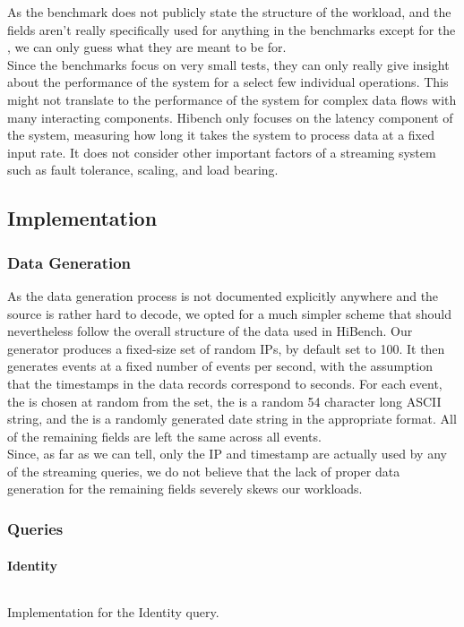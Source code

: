 As the benchmark does not publicly state the structure of the workload, and the fields aren't really specifically used for anything in the benchmarks except for the , we can only guess what they are meant to be for. \\

Since the benchmarks focus on very small tests, they can only really give insight about the performance of the system for a select few individual operations. This might not translate to the performance of the system for complex data flows with many interacting components. Hibench only focuses on the latency component of the system, measuring how long it takes the system to process data at a fixed input rate. It does not consider other important factors of a streaming system such as fault tolerance, scaling, and load bearing.

\subsection{Implementation}
\subsubsection{Data Generation}
As the data generation process is not documented explicitly anywhere and the source is rather hard to decode, we opted for a much simpler scheme that should nevertheless follow the overall structure of the data used in HiBench. Our generator produces a fixed-size set of random IPs, by default set to 100. It then generates events at a fixed number of events per second, with the assumption that the timestamps in the data records correspond to seconds. For each event, the  is chosen at random from the set, the  is a random 54 character long ASCII string, and the  is a randomly generated date string in the appropriate format. All of the remaining fields are left the same across all events. \\

Since, as far as we can tell, only the IP and timestamp are actually used by any of the streaming queries, we do not believe that the lack of proper data generation for the remaining fields severely skews our workloads.

\subsubsection{Queries}\label{section:hibench-queries}
\paragraph{Identity}
\begin{listing}[H]
  \inputminted[firstline=94,lastline=96]{rust}{benchmarks/src/hibench.rs}
  \caption{Implementation for the Identity query.}
  \label{lst:hibench-identity}
\end{listing}

